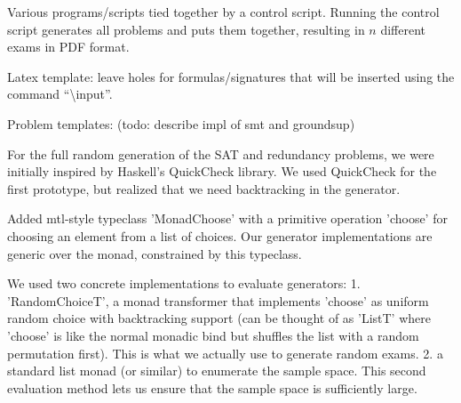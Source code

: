 Various programs/scripts tied together by a control script.
Running the control script generates all problems and puts them together, resulting in $n$ different exams in PDF format.


Latex template:
leave holes for formulas/signatures that will be inserted using the command ``\textbackslash{}input''.


Problem templates: (todo: describe impl of smt and groundsup)


For the full random generation of the SAT and redundancy problems,
we were initially inspired by Haskell's QuickCheck library.
We used QuickCheck for the first prototype, but realized that we need backtracking in the generator.

Added mtl-style typeclass 'MonadChoose' with a primitive operation 'choose' for choosing an element from a list of choices.
Our generator implementations are generic over the monad, constrained by this typeclass.

We used two concrete implementations to evaluate generators:
1. 'RandomChoiceT', a monad transformer that implements 'choose' as uniform random choice with backtracking support
    (can be thought of as 'ListT' where 'choose' is like the normal monadic bind but shuffles the list with a random permutation first).
    This is what we actually use to generate random exams.
2. a standard list monad (or similar) to enumerate the sample space.
    This second evaluation method lets us ensure that the sample space is sufficiently large.



